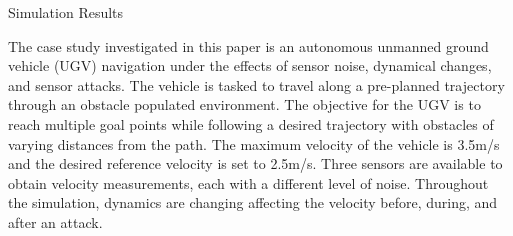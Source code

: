 
\begin{section}{Simulation Results}
\label{sec:simulation}



The case study investigated in this paper is an autonomous unmanned ground vehicle (UGV) navigation under the effects of sensor noise, dynamical changes, and sensor attacks. The vehicle is tasked to travel along a pre-planned trajectory through an obstacle populated environment. The objective for the UGV is to reach multiple goal points while following a desired trajectory with obstacles of varying distances from the path. The maximum velocity of the vehicle is 3.5m/s and the desired reference velocity is set to 2.5m/s. Three sensors are available to obtain velocity measurements, each with a different level of noise. Throughout the simulation, dynamics are changing affecting the velocity before, during, and after an attack.




\begin{figure}[b!th]
\begin{tabular}{ccc}


\end{tabular}
\end{figure}
\end{section}
